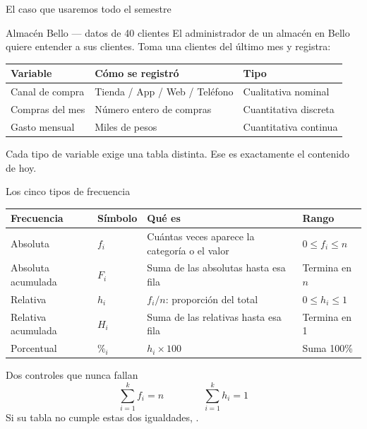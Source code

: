 \documentclass[aspectratio=169,10pt]{beamer}
\begin{document}
\begin{frame}{El caso que usaremos todo el semestre}
  \begin{exampleblock}{Almacén Bello — datos de 40 clientes}
    \footnotesize
    El administrador de un almacén en Bello quiere entender a sus clientes.
    Toma una  clientes del último mes y registra:

    \vspace{0.2cm}
    \begin{tabular}{@{}lll@{}}
      \toprule
      \textbf{Variable} & \textbf{Cómo se registró} & \textbf{Tipo} \\
      \midrule
      Canal de compra   & Tienda / App / Web / Teléfono & Cualitativa nominal \\
      Compras del mes   & Número entero de compras      & Cuantitativa discreta \\
      Gasto mensual     & Miles de pesos                & Cuantitativa continua \\
      \bottomrule
    \end{tabular}
  \end{exampleblock}

  \vspace{0.25cm}
  {\footnotesize\color{uniGris} Cada tipo de variable exige una tabla distinta.
  Ese es exactamente el contenido de hoy.}
\end{frame}


\begin{frame}{Los cinco tipos de frecuencia}
  \scriptsize
  \begin{center}
  \begin{tabular}{@{}p{2.4cm}p{1.3cm}p{5.4cm}p{2.6cm}@{}}
    \toprule
    \textbf{Frecuencia} & \textbf{Símbolo} & \textbf{Qué es} & \textbf{Rango} \\
    \midrule
    Absoluta            & $f_i$ & Cuántas veces aparece la categoría o el valor
                        & $0 \le f_i \le n$ \\
    Absoluta acumulada  & $F_i$ & Suma de las absolutas hasta esa fila
                        & Termina en $n$ \\
    Relativa            & $h_i$ & $f_i / n$: proporción del total
                        & $0 \le h_i \le 1$ \\
    Relativa acumulada  & $H_i$ & Suma de las relativas hasta esa fila
                        & Termina en 1 \\
    Porcentual          & $\%_i$ & $h_i \times 100$
                        & Suma 100\% \\
    \bottomrule
  \end{tabular}
  \end{center}

  \vspace{0.1cm}
  \begin{alertblock}{Dos controles que nunca fallan}
    \scriptsize
    \[ \sum_{i=1}^{k} f_i = n \qquad\qquad \sum_{i=1}^{k} h_i = 1 \]
    Si su tabla no cumple estas dos igualdades, .
  \end{alertblock}
\end{frame}
\end{document}
